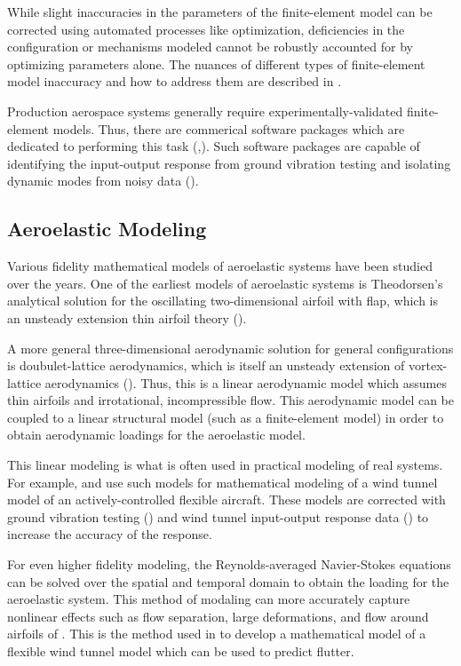 While slight inaccuracies in the parameters of the finite-element model can be corrected using automated processes like optimization, deficiencies in the configuration or mechanisms modeled cannot be robustly accounted for by optimizing parameters alone. The nuances of different types of finite-element model inaccuracy and how to address them are described in \cite{Chen2001}.

Production aerospace systems generally require experimentally-validated finite-element models. Thus, there are commerical software packages which are dedicated to performing this task (\cite{LMSTestLab2004},\cite{STARsite}). Such software packages are capable of identifying the input-output response from ground vibration testing and isolating dynamic modes from noisy data (\cite{Peeters2004}).

\subsection{Aeroelastic Modeling} %

Various fidelity mathematical models of aeroelastic systems have been studied over the years. One of the earliest models of aeroelastic systems is Theodorsen's analytical solution for the oscillating two-dimensional airfoil with flap, which is an unsteady extension thin airfoil theory (\cite{Theodorsen1949}).

A more general three-dimensional aerodynamic solution for general configurations is doubulet-lattice aerodynamics, which is itself an unsteady extension of vortex-lattice aerodynamics (\cite{Albano1969}). Thus, this is a linear aerodynamic model which assumes thin airfoils and irrotational, incompressible flow. This aerodynamic model can be coupled to a linear structural model (such as a finite-element model) in order to obtain aerodynamic loadings for the aeroelastic model.

This linear modeling is what is often used in practical modeling of real systems. For example, \cite{Vartio2005} and \cite{Penning2009} use such models for mathematical modeling of a wind tunnel model of an actively-controlled flexible aircraft. These models are corrected with ground vibration testing (\cite{Bartley-Cho2008}) and wind tunnel input-output response data (\cite{Vartio2008}) to increase the accuracy of the response.

For even higher fidelity modeling, the Reynolds-averaged Navier-Stokes equations can be solved over the spatial and temporal domain to obtain the loading for the aeroelastic system. This method of modaling can  more accurately capture nonlinear effects such as flow separation, large deformations, and flow around airfoils of . This is the method used in \cite{Argaman2019} to develop a mathematical model of a flexible wind tunnel model which can be used to predict flutter.

